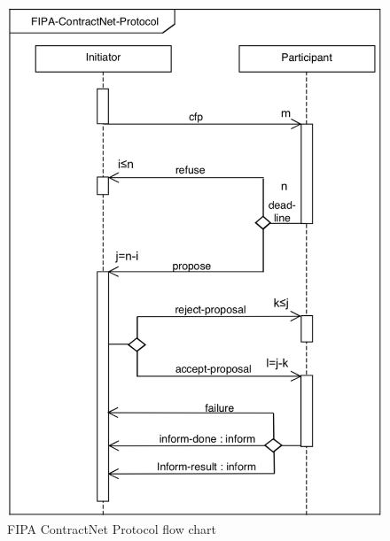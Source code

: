 \begin{figure}\centering
	\includegraphics[width=0.5\linewidth]{_appendices/_a2/fig/fipa-contract-net}
	\caption{FIPA ContractNet Protocol flow chart}
	\label{appx-b:fig:fipa-contract-net}
\end{figure}